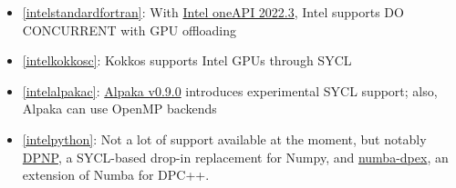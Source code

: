 \begin{frame}[allowframebreaks]
\begin{itemize}
        \item \ref{intelstandardfortran}: With \href{https://www.intel.com/content/www/us/en/developer/articles/release-notes/fortran-compiler-release-notes.html}{Intel oneAPI 2022.3}, Intel supports DO CONCURRENT with GPU offloading
        \item \ref{intelkokkosc}: Kokkos supports Intel GPUs through SYCL
        \item \ref{intelalpakac}: \href{https://github.com/alpaka-group/alpaka/releases/tag/0.9.0}{Alpaka v0.9.0} introduces experimental SYCL support; also, Alpaka can use OpenMP backends
        \item \ref{intelpython}: Not a lot of support available at the moment, but notably \href{https://intelpython.github.io/dpnp/}{DPNP}, a SYCL-based drop-in replacement for Numpy, and \href{https://github.com/IntelPython/numba-dpex}{numba-dpex}, an extension of Numba for DPC++.
    \end{itemize}
\end{frame}